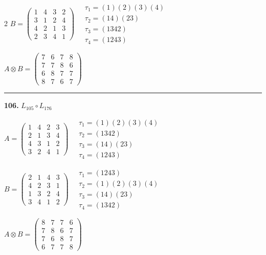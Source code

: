 \begin{multicols}{2}
$B = \begin{pmatrix} 1 & 4 & 3 & 2 \\ 3 & 1 & 2 & 4 \\ 4 & 2 & 1 & 3 \\ 2 & 3 & 4 & 1 \end{pmatrix} \quad \begin{matrix} \tau_{1}=(1)(2)(3)(4) \\ \tau_{2}=(1 4)(2 3) \\ \tau_{3}=(1 3 4 2) \\ \tau_{4}=(1 2 4 3) \end{matrix}$

$A \otimes B = \begin{pmatrix} 7 & 6 & 7 & 8 \\ 7 & 7 & 8 & 6 \\ 6 & 8 & 7 & 7 \\ 8 & 7 & 6 & 7 \end{pmatrix}$

\vspace{0.3em}
\hrule
\vspace{0.3em}

\noindent\textbf{106.} $L_{105} \circ L_{176}$

$A = \begin{pmatrix} 1 & 4 & 2 & 3 \\ 2 & 1 & 3 & 4 \\ 4 & 3 & 1 & 2 \\ 3 & 2 & 4 & 1 \end{pmatrix} \quad \begin{matrix} \tau_{1}=(1)(2)(3)(4) \\ \tau_{2}=(1 3 4 2) \\ \tau_{3}=(1 4)(2 3) \\ \tau_{4}=(1 2 4 3) \end{matrix}$

$B = \begin{pmatrix} 2 & 1 & 4 & 3 \\ 4 & 2 & 3 & 1 \\ 1 & 3 & 2 & 4 \\ 3 & 4 & 1 & 2 \end{pmatrix} \quad \begin{matrix} \tau_{1}=(1 2 4 3) \\ \tau_{2}=(1)(2)(3)(4) \\ \tau_{3}=(1 4)(2 3) \\ \tau_{4}=(1 3 4 2) \end{matrix}$

$A \otimes B = \begin{pmatrix} 8 & 7 & 7 & 6 \\ 7 & 8 & 6 & 7 \\ 7 & 6 & 8 & 7 \\ 6 & 7 & 7 & 8 \end{pmatrix}$


\end{multicols}
